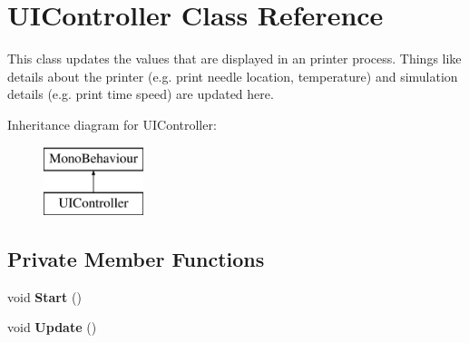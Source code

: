 \hypertarget{class_u_i_controller}{}\section{U\+I\+Controller Class Reference}
\label{class_u_i_controller}


This class updates the values that are displayed in an printer process. Things like details about the printer (e.\+g. print needle location, temperature) and simulation details (e.\+g. print time speed) are updated here.  


Inheritance diagram for U\+I\+Controller\+:\begin{figure}[H]
\begin{center}
\leavevmode
\includegraphics[height=2.000000cm]{class_u_i_controller}
\end{center}
\end{figure}
\subsection*{Private Member Functions}
\begin{DoxyCompactItemize}
\item 
\mbox{\label{class_u_i_controller_a676b3b972c33885db4565ee43f23e459}} 
void {\bfseries Start} ()
\item 
\mbox{\label{class_u_i_controller_adc5b0854a26bbcd71cc33274960bd0a9}} 
void {\bfseries Update} ()
\end{DoxyCompactItemize}
